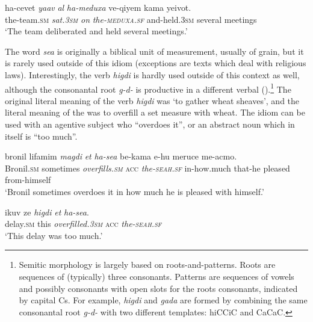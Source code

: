 \documentclass[output=paper]{langsci/langscibook}
\begin{document}
	\ea\label{she:meduxa-canon}
    	\gll ha-cevet \textit{ya{\shin}av} \textit{{\ayin}al} \textit{ha-meduxa} ve-qiyem kama ye{\shin}ivot.\\
    	   the-team.\textsc{sm} \textit{sat.\textsc{3sm}} \textit{on} \textit{the-\textsc{meduxa}.\textsc{sf}} and-held.\textsc{3sm} several meetings\\
    	\glt `The team deliberated and held several meetings.'
	\z

 The word \textit{se{\alef}a} is originally a biblical unit of measurement, usually of grain, but it is rarely used outside of this idiom (exceptions are texts which deal with religious laws). Interestingly, the verb \textit{higdi{\shin}} is hardly used outside of this context as well, although the consonantal root \textit{g-d-{\shin}} is productive in a different verbal  ().\footnote{Semitic morphology is largely based on roots-and-patterns. Roots are sequences of (typically) three consonants. Patterns are sequences of vowels and possibly consonants with open slots for the roots consonants, indicated by capital Cs. For example, \textit{higdi{\shin}} and \textit{gada{\shin}} are formed by combining the same consonantal root \textit{g-d-{\shin}} with two different templates: hiCCiC and CaCaC.} The original literal meaning of the verb \textit{higdi{\shin}} was `to gather wheat sheaves', and the literal meaning of the  was to overfill a set measure with wheat. The idiom can be used with an agentive subject  who ``overdoes it'', or an abstract noun  which in itself is ``too much''.

 	\ea\label{she:seah-canon1}
     	\gll bronil lif{\ayin}amim \textit{magdi{\shin}} \textit{{\alef}et} \textit{ha-se{\alef}a} be-kama {\shin}e-hu meruce me-{\ayin}acmo.\\
     	  Bronil.\textsc{sm} sometimes \textit{overfills.\textsc{sm}} \textsc{acc} \textit{the-\textsc{seah}.\textsc{sf}} in-how.much that-he pleased from-himself\\
     	\glt `Bronil sometimes overdoes it in how much he is pleased with himself.'
 	\z

 	\ea\label{she:seah-canon2}
     	\gll {\ayin}ikuv ze \textit{higdi{\shin}} \textit{{\alef}et} \textit{ha-se{\alef}a}.\\
     	  delay.\textsc{sm} this \textit{overfilled.\textsc{3sm}} \textsc{acc} \textit{the-\textsc{seah}.\textsc{sf}}\\
     	\glt `This delay was too much.'
 	\z
\end{document}
